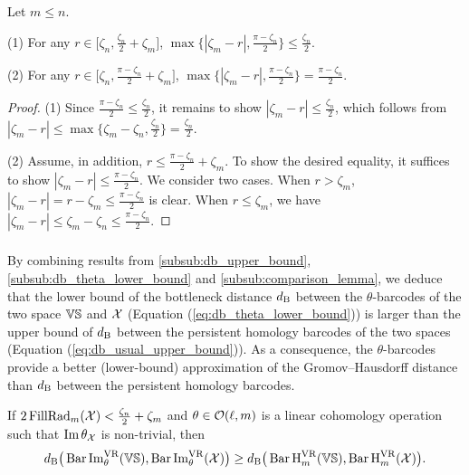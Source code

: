 \medskip\lemma
Let $m \leq n$.

(1) For any $r \in \big[\zeta_n, \tfrac{\zeta_n}{2}+\zeta_m\big]$, $\max\big\{|\zeta_m  - r |, \tfrac{\pi - \zeta_n}{2}\big\} \leq \tfrac{\zeta_n}{2}$.

(2) For any $r \in \big[\zeta_n, \tfrac{\pi - \zeta_n}{2} + \zeta_m\big]$, $\max\{|\zeta_m  - r |, \tfrac{\pi - \zeta_n}{2}\} = \tfrac{\pi - \zeta_n}{2}$.

\begin{proof}
    	(1) Since $\tfrac{\pi - \zeta_n}{2} \leq \tfrac{\zeta_n}{2}$, it remains to show $|\zeta_m  - r | \leq \tfrac{\zeta_n}{2}$, which follows from
    	\(
    	|\zeta_m  - r | \leq \max\big\{\zeta_m - \zeta_n, \tfrac{\zeta_n}{2}\big\} = \tfrac{\zeta_n}{2}.
    	\)

    	(2) Assume, in addition, $r \leq \tfrac{\pi - \zeta_n}{2} + \zeta_m$.
        To show the desired equality, it suffices to show $|\zeta_m  - r | \leq \tfrac{\pi - \zeta_n}{2}$.
        We consider two cases.
        When $r > \zeta_m$,
    	$|\zeta_m  - r | = r - \zeta_m \leq
        \tfrac{\pi - \zeta_n}{2}
    	$ is clear.
    	When $r \leq \zeta_m$, we have
    	\(
    	|\zeta_m  - r | \leq \zeta_m - \zeta_n
    	\leq \tfrac{\pi - \zeta_n}{2}.
    	\)
\end{proof}

\subsubsection{}
By combining results from \cref{subsub:db_upper_bound}, \cref{subsub:db_theta_lower_bound} and \cref{subsub:comparison_lemma}, we deduce that the lower bound of the bottleneck distance $\db$ between the $\theta$-barcodes of the two space $\VS$ and $\cX$ (Equation (\ref{eq:db_theta_lower_bound})) is larger than the upper bound of $\db$ between the persistent homology barcodes of the two spaces (Equation (\ref{eq:db_usual_upper_bound})).
As a consequence, the $\theta$-barcodes provide a better (lower-bound) approximation of the Gromov--Hausdorff distance than $\db$ between the persistent homology barcodes.

\medskip\proposition
If $2\firstdeath{m}{\cX} < \tfrac{\zeta_n}{2}+\zeta_m$ and $\theta \in \cO(\ell, m)$ is a linear cohomology operation such that $\img \theta_\cX$ is non-trivial, then
\[\db\big(\thetabarc{\VS}, \thetabarc{\cX}\big) \geq \db\big(\Hbarc[\field]{m}{\VS}, \Hbarc[\field]{m}{\cX}\big).\]

